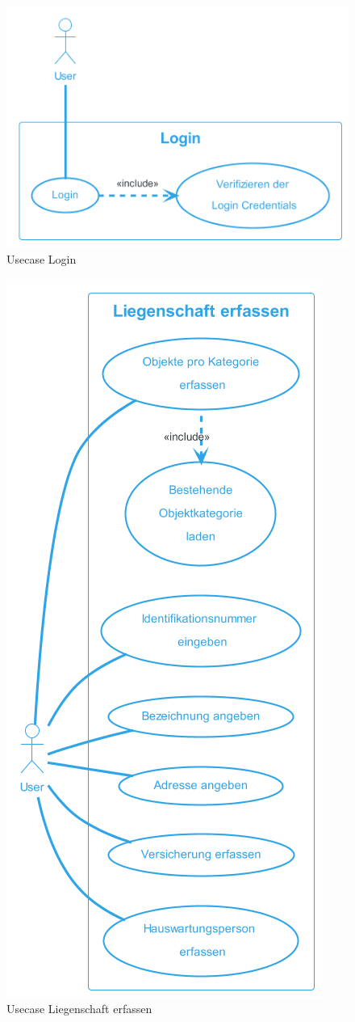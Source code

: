 \begin{figure}[H]
  \begin{center}
    \includegraphics[width=0.5\linewidth]{content/diagrams/out/usecase/login/Login.png}
    \caption{Usecase Login}
  \end{center}
  \label{login}
\end{figure}

\begin{figure}[H]
  \begin{center}
    \includegraphics[width=0.5\linewidth]{content/diagrams/out/usecase/liegenschaftErfassen/LiegenschaftErfassen.png}
    \caption{Usecase Liegenschaft erfassen}
  \end{center}
  \label{Liegenschaft}
\end{figure}

